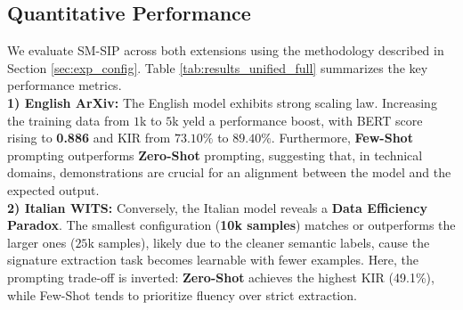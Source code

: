 \documentclass[conference]{IEEEtran}
\begin{document}
\subsection{Quantitative Performance}
We evaluate SM-SIP across both extensions using the methodology described in Section \ref{sec:exp_config}. Table \ref{tab:results_unified_full} summarizes the key performance metrics.\\
\textbf{1) English ArXiv:} The English model exhibits strong scaling law. Increasing the training data from $1$k to $5$k yeld a performance boost, with BERT score rising to \textbf{0.886} and KIR from $73.10\%$ to $89.40\%$. Furthermore, \textbf{Few-Shot} prompting outperforms \textbf{Zero-Shot} prompting, suggesting that, in technical domains, demonstrations are crucial for an alignment between the model and the expected output.\\
\textbf{2) Italian WITS:} Conversely, the Italian model reveals a \textbf{Data Efficiency Paradox}. The smallest configuration (\textbf{10k samples}) matches or outperforms the larger ones ($25$k samples), likely due to the cleaner semantic labels, cause the signature extraction task becomes learnable with fewer examples. Here, the prompting trade-off is inverted: \textbf{Zero-Shot} achieves the highest KIR (49.1\%), while Few-Shot tends to prioritize fluency over strict extraction.
\begin{table}[h]
\centering
\caption{Unified Results: English (ArXiv) vs Italian (WITS)}
\label{tab:results_unified_full}
\end{table}
\end{document}
